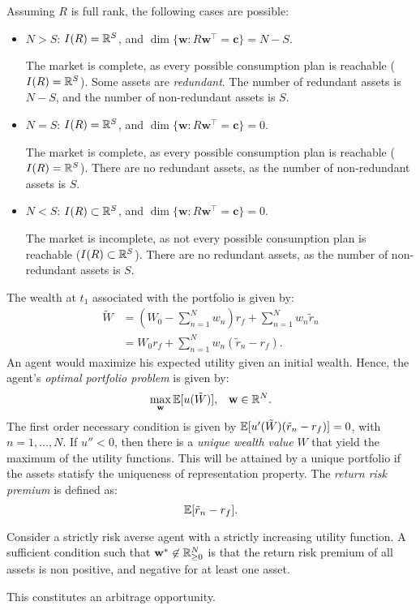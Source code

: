 \documentclass[twoside]{article}
\begin{document}
Assuming $R$ is full rank, the following cases are possible:
\begin{itemize}
    \item $N > S$: $I(R) = \mathbb{R}^S$, and $\dim\{\mathbf{w} : R\mathbf{w}^\top = \mathbf{c}\} = N-S$.
    \begin{explanation}
        The market is complete, as every possible consumption plan is reachable ($I(R) = \mathbb{R}^S$). Some assets are \textit{redundant}. The number of redundant assets is $N-S$, and the number of non-redundant assets is $S$.
    \end{explanation}
    \item $N = S$: $I(R) = \mathbb{R}^S$, and $\dim\{\mathbf{w} : R\mathbf{w}^\top = \mathbf{c}\} = 0$.
    \begin{explanation}
        The market is complete, as every possible consumption plan is reachable ($I(R) = \mathbb{R}^S$). There are no redundant assets, as the number of non-redundant assets is $S$.
    \end{explanation}
    \item $N < S$: $I(R) \subset \mathbb{R}^S$, and $\dim\{\mathbf{w} : R\mathbf{w}^\top = \mathbf{c}\} = 0$.
    \begin{explanation}
        The market is incomplete, as not every possible consumption plan is reachable ($I(R) \subset \mathbb{R}^S$). There are no redundant assets, as the number of non-redundant assets is $S$.
    \end{explanation}
\end{itemize}
The wealth at $t_1$ associated with the portfolio is given by:
\begin{align*}
    \tilde{W} &= \left(W_0 - \sum_{n=1}^N w_n\right)r_f + \sum_{n=1}^N w_n \tilde{r}_n \\
    &= W_0r_f + \sum_{n=1}^N w_n(\tilde{r}_n - r_f).
\end{align*} 
An agent would maximize his expected utility given an initial wealth. Hence, the agent's \textit{optimal portfolio problem} is given by:
\[
    \max_{\mathbf{w}} \mathbb{E}[u(\tilde{W})], \;\;\; \mathbf{w} \in \mathbb{R}^N.
\]
The first order necessary condition is given by $\mathbb{E}[u'(\tilde{W})(\tilde{r}_n - r_f)] = 0$, with $n = 1, \dots, N$. If $u'' < 0$, then there is a \textit{unique wealth value} $W$ that yield the maximum of the utility functions. This will be attained by a unique portfolio if the assets statisfy the uniqueness of representation property. The \textit{return risk premium} is defined as:
\[
    \mathbb{E}[\tilde{r}_n - r_f].
\]

\begin{proposition}
    Consider a strictly risk averse agent with a strictly increasing utility function. A sufficient condition such that $\mathbf{w}^* \not\in \mathbb{R}^N_{\geq 0}$ is that the return risk premium of all assets is non positive, and negative for at least one asset.
    \begin{explanation}
        This constitutes an arbitrage opportunity. 
    \end{explanation}
\end{proposition}
\end{document}
